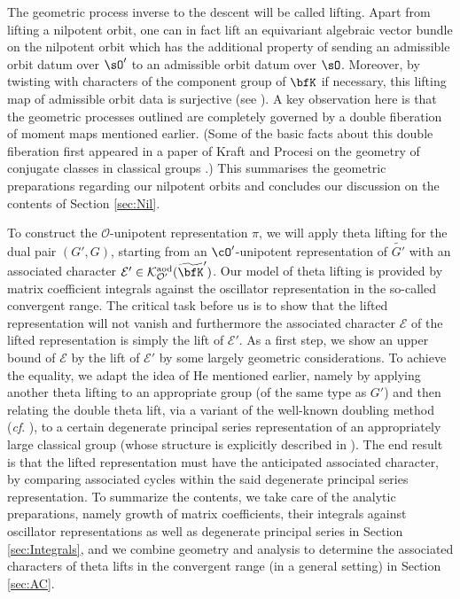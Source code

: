 \documentclass[12pt,a4paper]{amsart}
\newcommand{\CE}{{\mathcal {E}}}
\newcommand{\CK}{{\mathcal {K}}}
\newcommand{\CO}{{\mathcal {O}}}
\newcommand{\wt}{\widetilde}
\numberwithin{equation}{section}
\theoremstyle{remark}
\def\wtbfK{\widetilde{\bfK}}
\def\aod{\mathrm{aod}}
\begin{document}
The geometric process inverse to the descent will be called lifting. Apart from
lifting a nilpotent orbit, one can in fact lift an equivariant algebraic vector
bundle on the nilpotent orbit which has the additional property of sending an
admissible orbit datum over $\sO'$ to an admissible orbit datum over
$\sO$. Moreover, by twisting with characters of the component group of $\bfK$ if
necessary, this lifting map of admissible orbit data is surjective (see ). A key
observation here is that the geometric processes outlined are completely
governed by a double fiberation of moment maps mentioned earlier.  (Some of the
basic facts about this double fiberation first appeared in a paper of Kraft and
Procesi on the geometry of conjugate classes in classical groups \cite{KP}.)
This summarises the geometric preparations regarding our nilpotent orbits and
concludes our discussion on the contents of Section \ref{sec:Nil}.


To construct the $\CO$-unipotent representation $\pi$, we will apply theta
lifting for the dual pair $(G',G)$, starting from an ${\cO'}$-unipotent
representation of $\wt{G'}$ with an associated character
$\CE '\in \CK_{\CO'}^\aod(\wtbfK')$. Our model of theta lifting is provided by
matrix coefficient integrals against the oscillator representation in the
so-called convergent range.  The critical task before us is to show that the
lifted representation will not vanish and furthermore the associated character
$\CE$ of the lifted representation is simply the lift of $\CE'$. As a first
step, we show an upper bound of $\CE$ by the lift of $\CE'$ by some largely
geometric considerations. To achieve the equality, we adapt the idea of He
mentioned earlier, namely by applying another theta lifting to an appropriate
group (of the same type as $G'$) and then relating the double theta lift, via a
variant of the well-known doubling method (\emph{cf}. \cite{Ra, MVW}), to a
certain degenerate principal series representation of an appropriately large
classical group (whose structure is explicitly described in
\cite{LZ1,LZ2,Ya}). The end result is that the lifted representation must have
the anticipated associated character, by comparing associated cycles within the
said degenerate principal series representation. To summarize the contents, we
take care of the analytic preparations, namely growth of matrix coefficients,
their integrals against oscillator representations as well as degenerate
principal series in Section \ref{sec:Integrals}, and we combine geometry and
analysis to determine the associated characters of theta lifts in the convergent
range (in a general setting) in Section \ref{sec:AC}.
\end{document}
